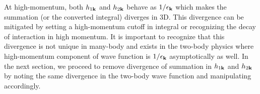 At high-momentum, both $h_{1\mathbf{k}}$ and $h_{2\mathbf{k}}$ behave as $1/\epsilon_{\mathbf{k}}$ which makes the summation (or the converted integral) diverges in 3D.  This divergence can be mitigated by setting a high-momentum cutoff in integral or recognizing the decay of interaction  in high momentum.  It is important to recognize that this divergence is not unique in many-body and exists in the two-body physics where  high-momentum component of wave function is  $1/\epsilon_{\mathbf{k}}$ asymptotically as well.  In the next section, we proceed to  remove divergence of summation in $h_{1\mathbf{k}}$ and $h_{2\mathbf{k}}$ by noting the same divergence in the two-body wave function and manipulating accordingly. 
 
